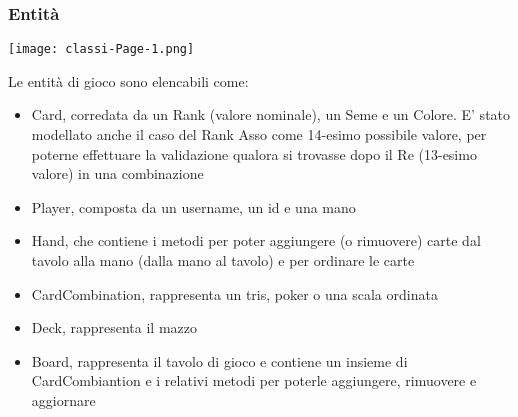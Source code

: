 \subsubsection{Entità}
\begin{center}
    \texttt{[image: classi-Page-1.png]}
\end{center}
Le entità di gioco sono elencabili come:
\begin{itemize}
    \item Card, corredata da un Rank (valore nominale), un Seme e un Colore.
    E’ stato modellato anche il caso del Rank Asso come 14-esimo possibile valore, per poterne effettuare la validazione qualora si trovasse dopo il Re (13-esimo valore) in una combinazione
    \item Player, composta da un username, un id e una mano
    \item Hand, che contiene i metodi per poter aggiungere (o rimuovere) carte dal tavolo alla mano (dalla mano al tavolo) e per ordinare le carte
    \item CardCombination, rappresenta un tris, poker o una scala ordinata
    \item Deck, rappresenta il mazzo
    \item Board, rappresenta il tavolo di gioco e contiene un insieme di CardCombiantion e i relativi metodi per poterle aggiungere, rimuovere e aggiornare
\end{itemize}

